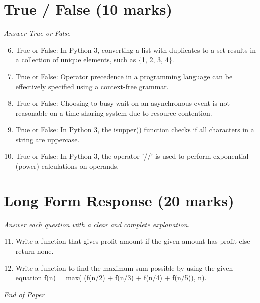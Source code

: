 \documentclass[12pt]{article}
\begin{document}
\section*{True / False (10 marks)}
\textit{Answer True or False}
\begin{enumerate}[label=\arabic*.]
\setcounter{enumi}{5}
\item True or False: In Python 3, converting a list with duplicates to a set results in a collection of unique elements, such as \{1, 2, 3, 4\}.
\item True or False: Operator precedence in a programming language can be effectively specified using a context-free grammar.
\item True or False: Choosing to busy-wait on an asynchronous event is not reasonable on a time-sharing system due to resource contention.
\item True or False: In Python 3, the isupper() function checks if all characters in a string are uppercase.
\item True or False: In Python 3, the operator '//' is used to perform exponential (power) calculations on operands.
\end{enumerate}

\section*{Long Form Response (20 marks)}
\textit{Answer each question with a clear and complete explanation.}
\begin{enumerate}[label=\arabic*.]
\setcounter{enumi}{10}
\item Write a function that gives profit amount if the given amount has profit else return none.
\item Write a function to find the maximum sum possible by using the given equation f(n) = max( (f(n/2) + f(n/3) + f(n/4) + f(n/5)), n).
\end{enumerate}

\vfill
\noindent\textit{End of Paper}
\end{document}
